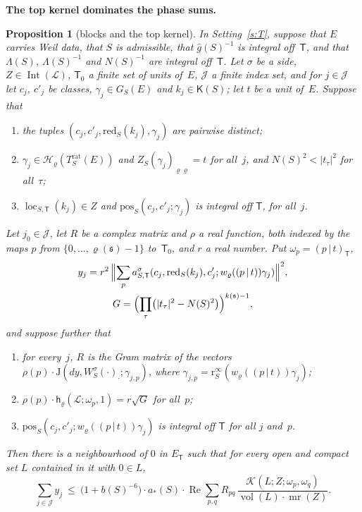 \documentclass[11pt,a4paper]{article}
\newcommand{\m}[1]{\mbox{$#1$}}        %
\newcommand{\subhead}[1]{\par\addvspace{9pt plus 2pt}\Needspace{4\baselineskip}\noindent\textbf{#1}\enspace\ignorespaces}
\theoremstyle{plainx}
\newtheorem{proposition}[theorem]{Proposition}
\theoremstyle{uprightx}
\newcommand{\fs}{\mathfrak{s}}                      %
\newcommand{\sT}{\mathsf{T}}                        %
\newcommand{\cL}{\mathcal{L}}                       %
\newcommand{\rh}[1]{\varrho(#1)}                    %
\newcommand{\kk}[1]{k(#1)}                          %
\newcommand{\ET}[1]{E_{#1}}                         %
\newcommand{\bS}[1]{b(#1)}                          %
\newcommand{\NS}[1]{N(#1)}                          %
\newcommand{\Trat}[2]{T^{\mathrm{rat}}_{#1}(#2)}    %
\newcommand{\GS}[2]{G_{#1}(#2)}                     %
\newcommand{\KS}[1]{\mathsf{K}(#1)}                          %
\newcommand{\redS}[1]{\mathrm{red}_{#1}}            %
\newcommand{\gid}[1]{\hat{g}(#1)}                   %
\newcommand{\latB}[1]{\Lambda(#1)}                  %
\newcommand{\rinf}[1]{\mathrm{r}^{\infty}_{#1}}     %
\newcommand{\pos}[4]{\mathrm{pos}_{#1}(#2,#3;#4)}   %
\newcommand{\Zf}[2]{Z_{#1}(#2)}                     %
\newcommand{\besfn}[4]{W^{#1}_{#2}(#3)_{#4}}        %
\newcommand{\packC}[1]{a_{*}(#1)}                   %
\newcommand{\IntG}[1]{\operatorname{Int}(#1)}       %
\newcommand{\mr}[1]{\operatorname{mr}(#1)}          %
\newcommand{\topK}[4]{\mathcal{K}(#1;#2;#3,#4)}     %
\newcommand{\cosamp}[7]{a^{#1}_{#2,#3}(#4,#5,#6;#7)} %
\newcommand{\loc}[2]{\operatorname{loc}_{#1,#2}}    %
\newcommand{\hdens}[4]{\mathsf{h}_{#2}(#1;#3,#4)}   %
\newcommand{\bcorr}[3]{\mathrm{J}(#1,#2;#3)}        %
\newcommand{\weyl}[2]{w_{#1}(#2)}                   %
\newcommand{\pad}[2]{(#1\,|\,#2)}                   %
\newcommand{\rePart}{\operatorname{Re}}
\newcommand{\vol}{\operatorname{vol}}
\begin{document}
\subhead{The top kernel dominates the phase sums.}
\begin{proposition}[blocks and the top kernel]\label{p:blocks}
In Setting~\ref{s:T}, suppose that $E$ carries Weil data, that $S$ is admissible, that \m{\gid{S}^{-1}} is
integral off~$\sT$, and that \m{\latB{S}}, \m{\latB{S}^{-1}} and \m{\NS{S}^{-1}} are integral off~$\sT$. Let
$\sigma$ be a side, \m{Z\in\IntG{\cL}}, $\sT_0$ a finite set of units of~$E$, $\mathcal J$ a finite index set,
and for \m{j\in\mathcal J} let $c_j$, $c'_j$ be classes, \m{\gamma_j\in\GS{S}{E}} and \m{k_j\in\KS{S}}; let $t$ be
a unit of~$E$. Suppose that
\begin{enumerate}[label=\textup{(\alph*)},leftmargin=2.3em,itemsep=1pt]
\item the tuples \m{(c_j,c'_j,\redS{S}(k_j),\gamma_j)} are pairwise distinct;
\item \m{\gamma_j\in\mathcal H_\varrho(\Trat{S}{E})} and \m{\Zf{S}{\gamma_j}_{\varrho\varrho}=t} for all~$j$, and
\m{\NS{S}^2<|t_\tau|^2} for all~$\tau$;
\item \m{\loc{S}{\sT}(k_j)\in Z} and \m{\pos{S}{c_j}{c'_j}{\gamma_j}} is integral off $\sT$, for all~$j$.
\end{enumerate}
Let \m{j_0\in\mathcal J}, let $R$ be a complex matrix and $\rho$ a real function, both indexed by the maps
$p$ from \m{\{0,\dots,\rh{\fs}-1\}} to~$\sT_0$, and $r$ a real number. Put \m{\omega_p=\pad{p}{t}_{\sT}},
\begin{gather*}y_j=r^2\,\Bigl\|\sum_p\cosamp{\sigma}{S}{\sT}{c_j}{\redS{S}(k_j)}{c'_j}{\weyl{\varrho}{\pad{p}{t}}\gamma_j}\Bigr\|^2,\\
G=\Bigl(\prod_\tau\bigl(|t_\tau|^2-\NS{S}^2\bigr)\Bigr)^{\kk{\fs}-1},\end{gather*}
and suppose further that
\begin{enumerate}[label=\textup{(\alph*)},leftmargin=2.3em,itemsep=1pt,start=4]
\item for every~$j$, $R$ is the Gram matrix of the vectors
$\rho(p)\cdot\bcorr{dy}{\besfn{\sigma}{S}{\cdot}{\cdot}}{\gamma_{j,p}}$, where
\m{\gamma_{j,p}=\rinf{S}(\weyl{\varrho}{\pad{p}{t}}\gamma_j)};
\item \m{\rho(p)\cdot\hdens{\cL}{\varrho}{\omega_p}{1}=r\sqrt G} for all~$p$;
\item \m{\pos{S}{c_j}{c'_j}{\weyl{\varrho}{\pad{p}{t}}\gamma_j}} is integral off $\sT$ for all $j$ and~$p$.
\end{enumerate}
Then there is a neighbourhood of $0$ in \m{\ET{\sT}} such that for every open and compact set $L$ contained in
it with \m{0\in L},
\[\sum_{j\in\mathcal J}y_j\ \le\ \bigl(1+\bS{S}^{-6}\bigr)\cdot\packC{S}\cdot\rePart\sum_{p,q}R_{pq}\,
\frac{\topK{L}{Z}{\omega_p}{\omega_q}}{\vol(L)\cdot\mr{Z}}.\]
\end{proposition}
\end{document}
